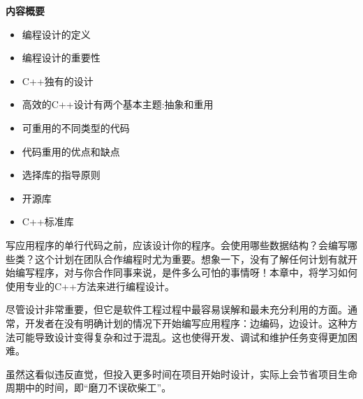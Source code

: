\noindent
\textbf{内容概要}

\begin{itemize}
\item
编程设计的定义

\item
编程设计的重要性

\item
C++独有的设计

\item
高效的C++设计有两个基本主题:抽象和重用

\item
可重用的不同类型的代码

\item
代码重用的优点和缺点

\item
选择库的指导原则

\item
开源库

\item
C++标准库
\end{itemize}

写应用程序的单行代码之前，应该设计你的程序。会使用哪些数据结构？会编写哪些类？这个计划在团队合作编程时尤为重要。想象一下，没有了解任何计划有就开始编写程序，对与你合作同事来说，是件多么可怕的事情呀！本章中，将学习如何使用专业的C++方法来进行编程设计。

尽管设计非常重要，但它是软件工程过程中最容易误解和最未充分利用的方面。通常，开发者在没有明确计划的情况下开始编写应用程序：边编码，边设计。这种方法可能导致设计变得复杂和过于混乱。这也使得开发、调试和维护任务变得更加困难。

虽然这看似违反直觉，但投入更多时间在项目开始时设计，实际上会节省项目生命周期中的时间，即“磨刀不误砍柴工”。













